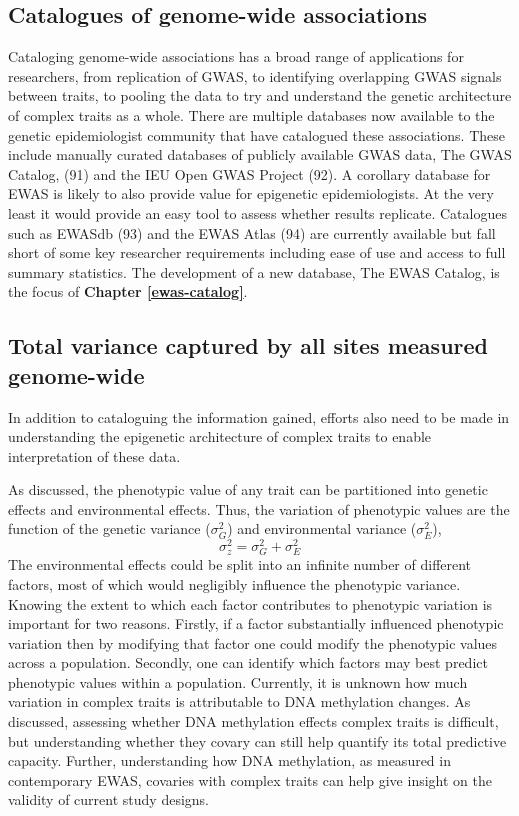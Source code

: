 \documentclass[11pt,oneside]{bristolthesis}
\begin{document}
\hypertarget{gwas-catalog}{%
\subsection{Catalogues of genome-wide associations}\label{gwas-catalog}}

Cataloging genome-wide associations has a broad range of applications for researchers, from replication of GWAS, to identifying overlapping GWAS signals between traits, to pooling the data to try and understand the genetic architecture of complex traits as a whole. There are multiple databases now available to the genetic epidemiologist community that have catalogued these associations. These include manually curated databases of publicly available GWAS data, The GWAS Catalog, (91) and the IEU Open GWAS Project (92). A corollary database for EWAS is likely to also provide value for epigenetic epidemiologists. At the very least it would provide an easy tool to assess whether results replicate. Catalogues such as EWASdb (93) and the EWAS Atlas (94) are currently available but fall short of some key researcher requirements including ease of use and access to full summary statistics. The development of a new database, The EWAS Catalog, is the focus of \textbf{Chapter \ref{ewas-catalog}}.

\hypertarget{heritability}{%
\subsection{Total variance captured by all sites measured genome-wide}\label{heritability}}

In addition to cataloguing the information gained, efforts also need to be made in understanding the epigenetic architecture of complex traits to enable interpretation of these data.

As discussed, the phenotypic value of any trait can be partitioned into genetic effects and environmental effects. Thus, the variation of phenotypic values are the function of the genetic variance (\(\sigma^2_{G}\)) and environmental variance (\(\sigma^2_{E}\)),
\begin{equation}
    \sigma^2_{z} = \sigma^2_{G} + \sigma^2_{E}
    \label{eq:phenotypic-variance}
\end{equation}
The environmental effects could be split into an infinite number of different factors, most of which would negligibly influence the phenotypic variance. Knowing the extent to which each factor contributes to phenotypic variation is important for two reasons. Firstly, if a factor substantially influenced phenotypic variation then by modifying that factor one could modify the phenotypic values across a population. Secondly, one can identify which factors may best predict phenotypic values within a population. Currently, it is unknown how much variation in complex traits is attributable to DNA methylation changes. As discussed, assessing whether DNA methylation effects complex traits is difficult, but understanding whether they covary can still help quantify its total predictive capacity. Further, understanding how DNA methylation, as measured in contemporary EWAS, covaries with complex traits can help give insight on the validity of current study designs.
\end{document}
